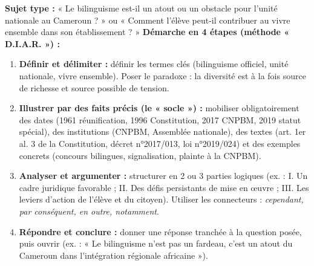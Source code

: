 \documentclass[11pt]{article}
\begin{document}
\begin{methode}
\textbf{Sujet type :} « Le bilinguisme est-il un atout ou un obstacle pour l'unité nationale au Cameroun ? » ou « Comment l'élève peut-il contribuer au vivre ensemble dans son établissement ? »
\textbf{Démarche en 4 étapes (méthode « D.I.A.R. ») :}
\begin{enumerate}
    \item \textbf{Définir et délimiter :} définir les termes clés (bilinguisme officiel, unité nationale, vivre ensemble). Poser le paradoxe : la diversité est à la fois source de richesse et source possible de tension.
    \item \textbf{Illustrer par des faits précis (le « socle ») :} mobiliser obligatoirement des dates (1961 réunification, 1996 Constitution, 2017 CNPBM, 2019 statut spécial), des institutions (CNPBM, Assemblée nationale), des textes (art. 1er al. 3 de la Constitution, décret n°2017/013, loi n°2019/024) et des exemples concrets (concours bilingues, signalisation, plainte à la CNPBM).
    \item \textbf{Analyser et argumenter :} structurer en 2 ou 3 parties logiques (ex. : I. Un cadre juridique favorable ; II. Des défis persistants de mise en œuvre ; III. Les leviers d'action de l'élève et du citoyen). Utiliser les connecteurs : \emph{cependant, par conséquent, en outre, notamment}.
    \item \textbf{Répondre et conclure :} donner une réponse tranchée à la question posée, puis ouvrir (ex. : « Le bilinguisme n'est pas un fardeau, c'est un atout du Cameroun dans l'intégration régionale africaine »).
\end{enumerate}
\end{methode}
\end{document}

